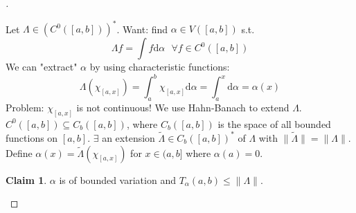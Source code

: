 \documentclass{article}
\newcommand{\sfa}{\text{  } \forall}
\theoremstyle{definition}
\newtheorem*{clm}{Claim}
\newenvironment{proofs}[1][\proofname]{%
  \begin{proof}[#1]$ $\par\nobreak\ignorespaces
}{%
  \end{proof}
}
\begin{document}
\begin{proofs}
	Let $\Lambda \in (C^0([a, b]))^*$.
	Want: find $\alpha \in V([a, b])$ s.t. 
	\[
		\Lambda f = \int f \mathrm{d} \alpha \sfa f \in C^0([a, b])
	\]
	We can "extract" $\alpha$ by using characteristic functions:
	\[
		\Lambda(\chi_{[a, x]}) = \int_a^b \chi_{[a, x]} \mathrm{d} \alpha = \int_a^x \mathrm{d} \alpha = \alpha(x)
	\]
	Problem: $\chi_{[a, x]}$ is not continuous!
	We use Hahn-Banach to extend $\Lambda$.
	$C^0([a, b]) \subseteq C_b([a, b])$, where $C_b([a, b])$ is the space of all bounded functions on $[a, b]$.
	$\exists$ an extension $\tilde{\Lambda} \in C_b([a, b])^*$ of $\Lambda$ with $\|\tilde{\Lambda}\| = \| \Lambda \|$.
	Define $\alpha(x) = \tilde{\Lambda}(\chi_{[a, x]})$ for $x \in (a, b]$ where $\alpha(a) = 0$.

	\begin{clm}
		$\alpha$ is of bounded variation and $T_\alpha(a, b) \leq \| \Lambda \|$.
	\end{clm}


\end{proofs}
\end{document}
